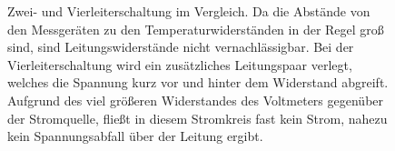 \begin{figure}[htp]
  \centering
  \caption{Zwei- und Vierleiterschaltung im Vergleich. Da die Abstände von den Messgeräten zu den Temperaturwiderständen in der Regel groß sind, sind Leitungswiderstände nicht vernachlässigbar. Bei der Vierleiterschaltung wird ein zusätzliches Leitungspaar verlegt, welches die Spannung kurz vor und hinter dem Widerstand abgreift. Aufgrund des viel größeren Widerstandes des Voltmeters gegenüber der Stromquelle, fließt in diesem Stromkreis fast kein Strom, nahezu kein Spannungsabfall über der Leitung ergibt.}
  \label{fig:Schaltung}
\end{figure}
